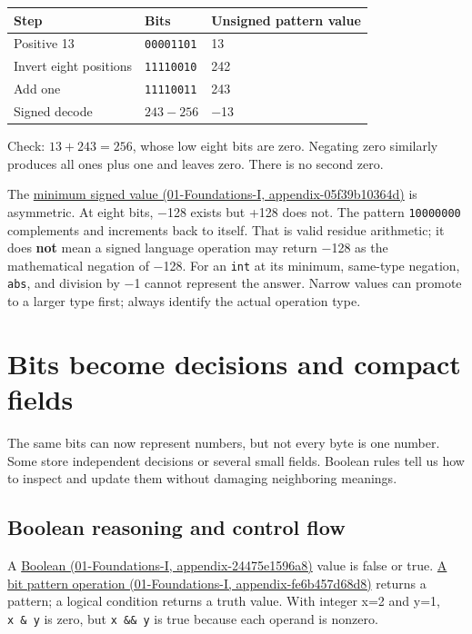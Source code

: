{\def\LTcaptype{none} %
\begin{longtable}[]{@{}lll@{}}
\toprule\noalign{}
Step & Bits & Unsigned pattern value \\
\midrule\noalign{}
\endhead
\bottomrule\noalign{}
\endlastfoot
Positive 13 & \texttt{00001101} & 13 \\
Invert eight positions & \texttt{11110010} & 242 \\
Add one & \texttt{11110011} & 243 \\
Signed decode & \(243-256\) & −13 \\
\end{longtable}
}

Check: \(13+243=256\), whose low eight bits are zero. Negating zero similarly produces all ones plus one and leaves zero. There is no second zero.

The \href{../01-Foundations-I/main.pdf\#nameddest=appendix-05f39b10364d}{minimum signed value (01-Foundations-I, appendix-05f39b10364d)} is asymmetric. At eight bits, −128 exists but +128 does not. The pattern \texttt{10000000} complements and increments back to itself. That is valid residue arithmetic; it does \textbf{not} mean a signed language operation may return −128 as the mathematical negation of −128. For an \texttt{int} at its minimum, same-type negation, \texttt{abs}, and division by −1 cannot represent the answer. Narrow values can promote to a larger type first; always identify the actual operation type.

\section{Bits become decisions and compact fields}\label{05-engine-i-ch001-bits-become-decisions-and-compact-fields}

The same bits can now represent numbers, but not every byte is one number. Some store independent decisions or several small fields. Boolean rules tell us how to inspect and update them without damaging neighboring meanings.

\subsection{Boolean reasoning and control flow}\label{05-engine-i-ch001-boolean-reasoning-and-control-flow}

A \href{../01-Foundations-I/main.pdf\#nameddest=appendix-24475e1596a8}{Boolean (01-Foundations-I, appendix-24475e1596a8)} value is false or true. \href{../01-Foundations-I/main.pdf\#nameddest=appendix-fe6b457d68d8}{A bit pattern operation (01-Foundations-I, appendix-fe6b457d68d8)} returns a pattern; a logical condition returns a truth value. With integer x=2 and y=1, \texttt{x\ \&\ y} is zero, but \texttt{x\ \&\&\ y} is true because each operand is nonzero.

